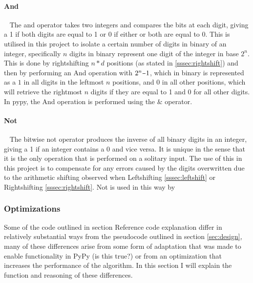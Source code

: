 \documentclass[12pt]{article}
\newcommand{\minus}{\scalebox{0.75}[1.0]{$-$}}
\begin{document}
\paragraph{And}\
\newline
The and operator takes two integers and compares the bits at each digit, giving a 1 if both digits are equal to 1 or 0 if either or both are equal to $0$. This is utilised in this project to isolate a certain number of digits in binary of an integer, specifically $n$ digits in binary represent one digit of the integer in base $2^{n}$. This is done by rightshifting $n*d$ positions (as stated in \ref{sssec:rightshift}) and then by performing an And operation with $2^{n}\minus1$, which in binary is represented as a $1$ in all digits in the leftmost $n$ positions, and 0 in all other positions, which will retrieve the rightmost $n$ digits if they are equal to 1 and 0 for all other digits.
\newline
In pypy, the And operation is performed using the $\&$ operator.
\newline
\paragraph{Not}\
\newline
The bitwise not operator produces the inverse of all binary digits in an integer, giving a 1 if an integer contains a 0 and vice versa. It is unique in the sense that it is the only operation that is performed on a solitary input. The use of this in this project is to compensate for any errors caused by the digits overwritten due to the arithmetic shifting observed when  Leftshifting \ref{sssec:leftshift} or Rightshifting \ref{sssec:rightshift}.
\newline
Not is used in this way by 


\pagebreak
\subsubsection{Optimizations}
Some of the code outlined in section {\color{red} Reference code explanation} differ in relatively substantial ways from the pseudocode outlined in section \ref{sec:design}, many of these differences arise from some form of adaptation that was made to enable functionality in PyPy {\color{red} (is this true?)} or from an optimization that increases the performance of the algorithm. In this section I will explain the function and reasoning of these differences.

\pagebreak
\end{document}
